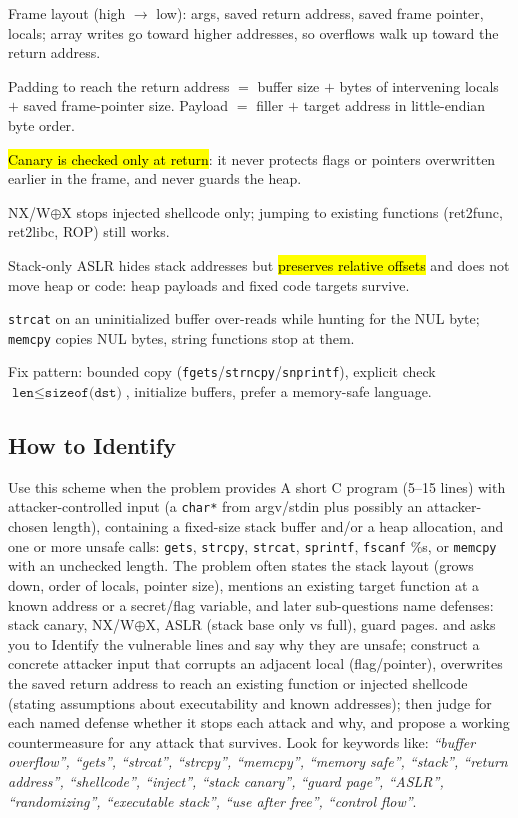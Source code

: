 \documentclass[12pt, a4paper]{article}
\newcommand{\imp}[1]{\hl{#1}}                       %
\begin{document}
\begin{theorybox}
\begin{tightitem}
    \item Frame layout (high $\rightarrow$ low): args, saved return address, saved frame pointer, locals; array writes go toward higher addresses, so overflows walk up toward the return address.
    \item Padding to reach the return address $=$ buffer size $+$ bytes of intervening locals $+$ saved frame-pointer size. Payload $=$ filler $+$ target address in little-endian byte order.
    \item \imp{Canary is checked only at return}: it never protects flags or pointers overwritten earlier in the frame, and never guards the heap.
    \item NX/W$\oplus$X stops injected shellcode only; jumping to existing functions (ret2func, ret2libc, ROP) still works.
    \item Stack-only ASLR hides stack addresses but \imp{preserves relative offsets} and does not move heap or code: heap payloads and fixed code targets survive.
    \item \texttt{strcat} on an uninitialized buffer over-reads while hunting for the NUL byte; \texttt{memcpy} copies NUL bytes, string functions stop at them.
    \item Fix pattern: bounded copy (\texttt{fgets}/\texttt{strncpy}/\texttt{snprintf}), explicit check $\texttt{len} \leq \texttt{sizeof(dst)}$, initialize buffers, prefer a memory-safe language.
\end{tightitem}
\end{theorybox}

\subsection*{How to Identify}
Use this scheme when the problem provides A short C program (5--15 lines) with attacker-controlled input (a \texttt{char*} from argv/stdin plus possibly an attacker-chosen length), containing a fixed-size stack buffer and/or a heap allocation, and one or more unsafe calls: \texttt{gets}, \texttt{strcpy}, \texttt{strcat}, \texttt{sprintf}, \texttt{fscanf} \%s, or \texttt{memcpy} with an unchecked length. The problem often states the stack layout (grows down, order of locals, pointer size), mentions an existing target function at a known address or a secret/flag variable, and later sub-questions name defenses: stack canary, NX/W$\oplus$X, ASLR (stack base only vs full), guard pages. and asks you to Identify the vulnerable lines and say why they are unsafe; construct a concrete attacker input that corrupts an adjacent local (flag/pointer), overwrites the saved return address to reach an existing function or injected shellcode (stating assumptions about executability and known addresses); then judge for each named defense whether it stops each attack and why, and propose a working countermeasure for any attack that survives. Look for keywords like: \textit{``buffer overflow'', ``gets'', ``strcat'', ``strcpy'', ``memcpy'', ``memory safe'', ``stack'', ``return address'', ``shellcode'', ``inject'', ``stack canary'', ``guard page'', ``ASLR'', ``randomizing'', ``executable stack'', ``use after free'', ``control flow''}.
\end{document}
